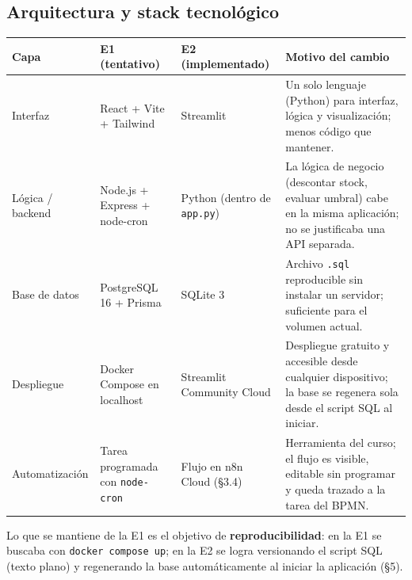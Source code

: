 \documentclass[11pt,letterpaper]{article}
\renewcommand{\_}{\oldus\allowbreak}
\begin{document}
\subsection{Arquitectura y stack tecnológico}
\begin{center}
\small
\begin{tabularx}{\textwidth}{>{\raggedright\arraybackslash}p{2.6cm} >{\raggedright\arraybackslash}p{3.6cm} >{\raggedright\arraybackslash}p{3.2cm} >{\raggedright\arraybackslash}X}
\toprule
\textbf{Capa} & \textbf{E1 (tentativo)} & \textbf{E2 (implementado)} & \textbf{Motivo del cambio} \\
\midrule
Interfaz & React + Vite + Tailwind & Streamlit & Un solo lenguaje (Python) para interfaz, lógica y visualización; menos código que mantener. \\
Lógica / backend & Node.js + Express + node-cron & Python (dentro de \texttt{app.py}) & La lógica de negocio (descontar stock, evaluar umbral) cabe en la misma aplicación; no se justificaba una API separada. \\
Base de datos & PostgreSQL 16 + Prisma & SQLite 3 & Archivo \texttt{.sql} reproducible sin instalar un servidor; suficiente para el volumen actual. \\
Despliegue & Docker Compose en localhost & Streamlit Community Cloud & Despliegue gratuito y accesible desde cualquier dispositivo; la base se regenera sola desde el script SQL al iniciar. \\
Automatización & Tarea programada con \texttt{node-cron} & Flujo en n8n Cloud (§3.4) & Herramienta del curso; el flujo es visible, editable sin programar y queda trazado a la tarea del BPMN. \\
\bottomrule
\end{tabularx}
\end{center}

Lo que se mantiene de la E1 es el objetivo de \textbf{reproducibilidad}: en la E1 se buscaba con \texttt{docker compose up}; en la E2 se logra versionando el script SQL (texto plano) y regenerando la base automáticamente al iniciar la aplicación (§5).
\end{document}

